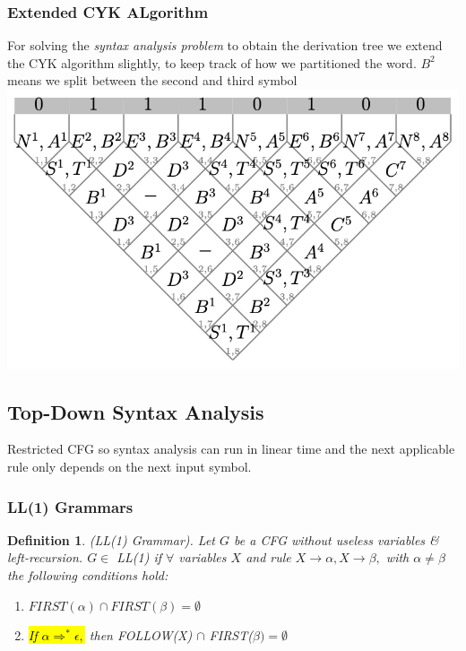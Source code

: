 \documentclass[a3paper, 8pt]{extarticle}
\newtheorem*{definition}{Definition}
\begin{document}
\begin{multicols*}{6}
\subsubsection{Extended CYK ALgorithm}
For solving the \textit{syntax analysis problem} to obtain the derivation tree we extend the CYK algorithm slightly, to keep track of how we partitioned the word.
$B^2$ means we split between the second and third symbol
\includegraphics[width = \columnwidth]{images/Screen Shot 2022-11-21 at 16.10.19.png}

\subsection{Top-Down Syntax Analysis}
Restricted CFG so syntax analysis can run in linear time and the next applicable rule only depends on the next input symbol.

\subsubsection{LL(1) Grammars}


\begin{definition}
     (LL(1) Grammar). Let $G$ be a CFG without useless variables \& left-recursion. $G \in$ LL(1) if $\forall$ variables $X$ and rule $X \to \alpha, X \to \beta,$ with $\alpha \neq \beta$ the following conditions hold:
     \begin{enumerate}
         \item $FIRST(\alpha) \cap FIRST(\beta) = \emptyset$
         \item \hl{If $\alpha \Rightarrow^* \epsilon,$} then FOLLOW(X) $\cap$ FIRST($\beta)= \emptyset$
     \end{enumerate}


\end{definition}
\end{multicols*}
\end{document}
